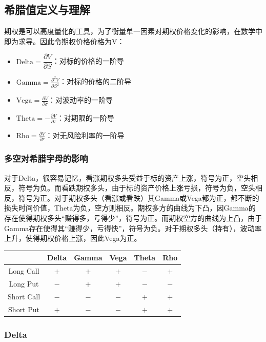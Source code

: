 \documentclass[11pt]{article}
\begin{document}
\subsection{希腊值定义与理解}

期权是可以高度量化的工具，为了衡量单一因素对期权价格变化的影响，在数学中即为求导。因此令期权价格价格为V：
\begin{itemize}
    \item $\text{Delta} = \dfrac{\partial V}{\partial S}$：对标的价格的一阶导
    \item $\text{Gamma}  = \frac{\partial^2 V}{\partial S^2}$：对标的价格的二阶导
    \item $\text{Vega} = \frac{\partial V}{\partial\sigma}$：对波动率的一阶导
    \item $\text{Theta} = -\frac{\partial V}{\partial \tau}$：对期限的一阶导
    \item $\text{Rho} = \frac{\partial V}{\partial r}$：对无风险利率的一阶导
\end{itemize}

\subsubsection{多空对希腊字母的影响}

对于Delta，很容易记忆，看涨期权多头受益于标的资产上涨，符号为正，空头相反，符号为负。而看跌期权多头，由于标的资产价格上涨亏损，符号为负，空头相反，符号为正。对于期权多头（看涨或看跌）其Gamma或Vega都为正，都不断的损失时间价值，Theta为负，空方则相反。期权多方的曲线为下凸，因Gamma的存在使得期权多头“赚得多，亏得少”，符号为正。而期权空方的曲线为上凸，由于Gamma存在使得其“赚得少，亏得快”，符号为负。对于期权多头（持有），波动率上升，使得期权价格上涨，因此Vega为正。
\begin{table}[H]
\centering
\begin{tabular}{@{}cccccc@{}} \toprule
           & Delta & Gamma & Vega & Theta & Rho \\ \midrule
Long Call  & $+$ & $+$ & $+$ & $-$ & $+$ \\
Long Put   & $-$ & $+$ & $+$ & $-$ & $-$ \\
Short Call & $-$ & $-$ & $-$ & $+$ & $+$ \\
Short Put  & $+$ & $-$ & $-$ & $+$ & $+$ \\ \bottomrule
\end{tabular}
\end{table}

\subsubsection{Delta}
\end{document}

